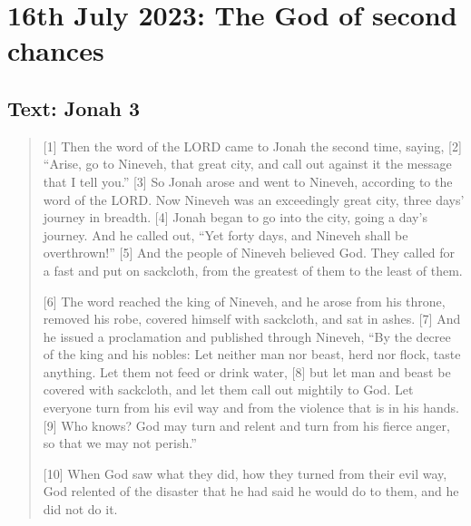 \setcounter{figure}{0}

\section{16th July 2023: The God of second chances}
\subsection*{Text: Jonah 3}
  \begin{quote}
    [1] Then the word of the LORD came to Jonah the second time, saying, [2] “Arise, go to Nineveh, that great city, and call out against it the message that I tell you.” [3] So Jonah arose and went to Nineveh, according to the word of the LORD. Now Nineveh was an exceedingly great city, three days’ journey in breadth. [4] Jonah began to go into the city, going a day’s journey. And he called out, “Yet forty days, and Nineveh shall be overthrown!” [5] And the people of Nineveh believed God. They called for a fast and put on sackcloth, from the greatest of them to the least of them.

    [6] The word reached the king of Nineveh, and he arose from his throne, removed his robe, covered himself with sackcloth, and sat in ashes. [7] And he issued a proclamation and published through Nineveh, “By the decree of the king and his nobles: Let neither man nor beast, herd nor flock, taste anything. Let them not feed or drink water, [8] but let man and beast be covered with sackcloth, and let them call out mightily to God. Let everyone turn from his evil way and from the violence that is in his hands. [9] Who knows? God may turn and relent and turn from his fierce anger, so that we may not perish.”

    [10] When God saw what they did, how they turned from their evil way, God relented of the disaster that he had said he would do to them, and he did not do it.
  \end{quote}
